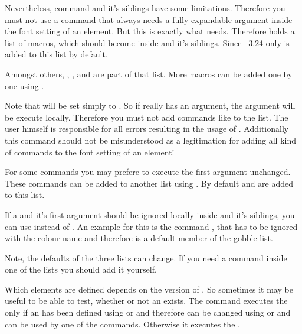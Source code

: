 Nevertheless, command  and it's
siblings have some limitations. Therefore you must not use a command that
always needs a fully expandable argument inside the font setting of an
element. But this is exactly what 
needs. Therefore \KOMAScript{} holds a list of macros, which should become
 inside  and it's
siblings. Since \KOMAScript~3.24 only  is added to
this list by default.

Amongst others, , , and
 are part of that list. More macros can be added one by
one using .

Note that  will be set simply to . So if
 really has an argument, the argument will be execute
locally. Therefore you must not add commands like  to the
list. The user himself is responsible for all errors resulting in the usage of
. Additionally this command should not be
misunderstood as a legitimation for adding all kind of commands to the font
setting of an element!

For some commands you may prefere to execute the first
argument unchanged. These commands can be added to another list using
. By default  and
 are added to this list.

If
a  and it's first argument should be ignored locally inside
 and it's siblings, you can use
 instead of . An
example for this is the command , that has to be ignored with the
colour name and therefore is a default member of the gobble-list.

Note, the defaults of the three lists can change. If you need a command inside
one of the lists you should add it yourself.%
\EndIndexGroup


\begin{Declaration}
\end{Declaration}
Which elements are defined depends on the
version of \KOMAScript. So sometimes it may be useful to be able to test,
whether or not an  exists. The command executes the  only if an  has been defined using
 or 
and therefore can be changed using  or
 and can be used by one of the
 commands. Otherwise it executes the .%
\EndIndexGroup

